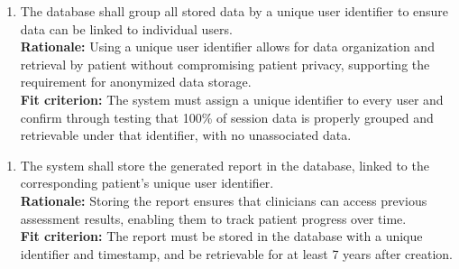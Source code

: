 \documentclass[12pt]{article}
\begin{document}
\begin{enumerate}[{FR-DSC}4. ]
  \item The database shall group all stored data by a unique user identifier to ensure data can be linked to 
  individual users.\\
  \textbf{Rationale: }Using a unique user identifier allows for data organization and retrieval by patient without 
  compromising patient privacy, supporting the requirement for anonymized data storage.\\
  \textbf{Fit criterion: }The system must assign a unique identifier to every user and confirm through testing 
  that 100\% of session data is properly grouped and retrievable under that identifier, with no unassociated 
  data.
\end{enumerate}
\begin{enumerate}[{FR-DSC}5. ]
  \item The system shall store the generated report in the database, linked to the corresponding patient’s unique user identifier.\\
  \textbf{Rationale: }Storing the report ensures that clinicians can access previous assessment results, enabling them to track patient progress over time.\\
  \textbf{Fit criterion: }The report must be stored in the database with a unique identifier and timestamp, and be retrievable for at least 7 years after creation.
\end{enumerate}
\end{document}
